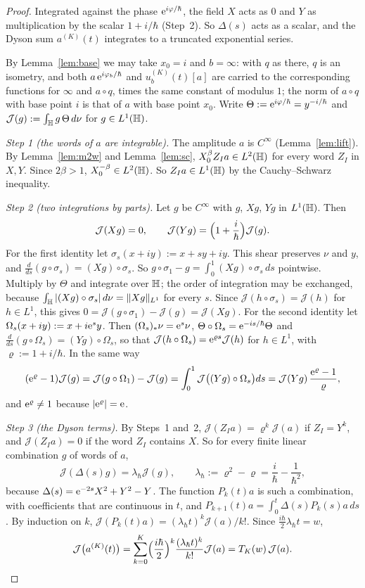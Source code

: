 \begin{proof}
Integrated against the phase $\mathrm{e}^{i\varphi/\hbar}$, the field $X$ acts as $0$ and $Y$ as multiplication by the scalar
$1+i/\hbar$ (Step~2). So $\Delta(s)$ acts as a scalar, and the Dyson sum $a^{(K)}(t)$ integrates to a truncated exponential series.

By Lemma~\ref{lem:base} we may take $x_0=i$ and $b=\infty$: with $q$ as there, $q$ is an isometry, and both
$a\,\mathrm{e}^{i\varphi_b/\hbar}$ and $u^{(K)}_b(t)[a]$ are carried to the corresponding functions for $\infty$ and $a\circ q$, times the same
constant of modulus $1$; the norm of $a\circ q$ with base point $i$ is that of $a$ with base point $x_0$. Write $\Theta:=\mathrm{e}^{i\varphi/\hbar}=y^{-i/\hbar}$ and $\mathcal J(g):=\int_{\mathbb{H}}g\,\Theta\,d\nu$ for $g\in L^1(\mathbb{H})$.

\emph{Step 1 (the words of $a$ are integrable).} The amplitude $a$ is $C^\infty$ (Lemma~\ref{lem:lift}). By Lemma~\ref{lem:m2w} and
Lemma~\ref{lem:sc}, $X_0^\beta Z_Ia\in L^2(\mathbb{H})$ for every word $Z_I$ in $X,Y$. Since $2\beta>1$, $X_0^{-\beta}\in L^2(\mathbb{H})$. So
$Z_Ia\in L^1(\mathbb{H})$ by the Cauchy--Schwarz inequality.

\emph{Step 2 (two integrations by parts).} Let $g$ be $C^\infty$ with $g$, $Xg$, $Yg$ in $L^1(\mathbb{H})$. Then
\[
  \mathcal J(Xg)=0,\qquad \mathcal J(Yg)=\Bigl(1+\frac i\hbar\Bigr)\mathcal J(g).
\]
For the first identity let $\sigma_s(x+iy):=x+sy+iy$. This shear preserves $\nu$ and $y$, and
$\tfrac{d}{ds}(g\circ\sigma_s)=(Xg)\circ\sigma_s$. So $g\circ\sigma_1-g=\int_0^1(Xg)\circ\sigma_s\,ds$ pointwise. Multiply by $\Theta$ and
integrate over $\mathbb{H}$; the order of integration may be exchanged, because $\int_{\mathbb{H}}|(Xg)\circ\sigma_s|\,d\nu=\lVert Xg\rVert_{L^1}$ for
every $s$. Since $\mathcal J(h\circ\sigma_s)=\mathcal J(h)$ for $h\in L^1$, this gives $0=\mathcal J(g\circ\sigma_1)-\mathcal J(g)=\mathcal J(Xg)$. For the second identity let
$\Omega_s(x+iy):=x+i\mathrm{e}^sy$. Then $(\Omega_s)_*\nu=\mathrm{e}^s\nu$, $\Theta\circ\Omega_s=\mathrm{e}^{-is/\hbar}\Theta$ and
$\tfrac{d}{ds}(g\circ\Omega_s)=(Yg)\circ\Omega_s$, so that $\mathcal J(h\circ\Omega_s)=\mathrm{e}^{\varrho s}\mathcal J(h)$ for $h\in L^1$, with $\varrho:=1+i/\hbar$. In
the same way
\[
  (\mathrm{e}^{\varrho}-1)\mathcal J(g)=\mathcal J(g\circ\Omega_1)-\mathcal J(g)=\int_0^1\mathcal J\bigl((Yg)\circ\Omega_s\bigr)ds=\mathcal J(Yg)\,\frac{\mathrm{e}^{\varrho}-1}{\varrho},
\]
and $\mathrm{e}^\varrho\ne1$ because $|\mathrm{e}^\varrho|=\mathrm{e}$.

\emph{Step 3 (the Dyson terms).} By Steps~1 and~2, $\mathcal J(Z_Ia)=\varrho^k\mathcal J(a)$ if $Z_I=Y^k$, and $\mathcal J(Z_Ia)=0$ if the word $Z_I$ contains $X$. So for every finite linear combination $g$ of words of $a$,
\[
  \mathcal J(\Delta(s)g)=\lambda_\hbar\mathcal J(g),\qquad\lambda_\hbar:=\varrho^2-\varrho=\frac i\hbar-\frac1{\hbar^2},
\]
because $\Delta(s)=\mathrm{e}^{-2s}X^2+Y^2-Y$. The function $P_k(t)a$ is such a combination, with coefficients that are continuous in
$t$, and $P_{k+1}(t)a=\int_0^t\Delta(s)P_k(s)a\,ds$. By induction on $k$, $\mathcal J(P_k(t)a)=(\lambda_\hbar t)^k\mathcal J(a)/k!$. Since
$\tfrac{i\hbar}2\lambda_\hbar t=w$,
\[
  \mathcal J\bigl(a^{(K)}(t)\bigr)=\sum_{k=0}^{K}\Bigl(\frac{i\hbar}2\Bigr)^k\frac{(\lambda_\hbar t)^k}{k!}\mathcal J(a)=T_K(w)\,\mathcal J(a).
\]


\end{proof}
